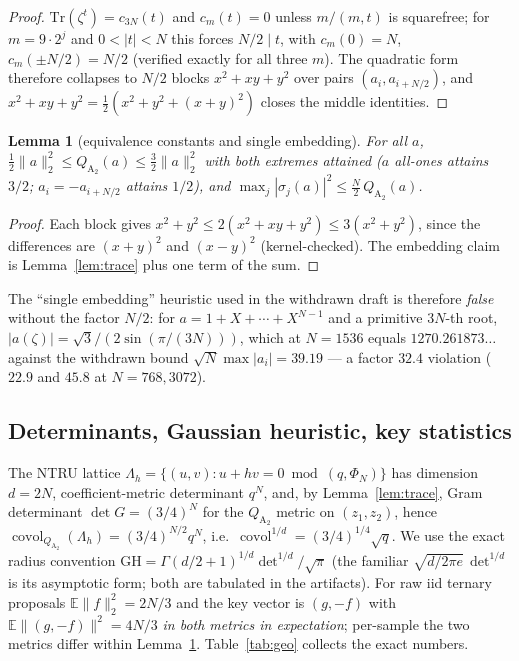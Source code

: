 \documentclass[11pt,a4paper]{article}
\newtheorem{lemma}{Lemma}
\theoremstyle{remark}
\newcommand{\Atwo}{Q_{\mathrm{A}_2}}
\begin{document}
\begin{proof}
$\mathrm{Tr}(\zeta^t)=c_{3N}(t)$ and $c_m(t)=0$ unless $m/(m,t)$ is
squarefree; for $m=9\cdot 2^{j}$ and $0<|t|<N$ this forces $N/2\mid t$, with
$c_m(0)=N$, $c_m(\pm N/2)=N/2$ (verified exactly for all three $m$). The
quadratic form therefore collapses to $N/2$ blocks
$x^2+xy+y^2$ over pairs $(a_i,a_{i+N/2})$, and
$x^2+xy+y^2=\tfrac12(x^2+y^2+(x+y)^2)$ closes the middle identities.
\end{proof}

\begin{lemma}[equivalence constants and single embedding]\label{lem:equiv}
For all $a$, $\tfrac12\|a\|_2^2\le \Atwo(a)\le \tfrac32\|a\|_2^2$ with both
extremes attained ($a$ all-ones attains $3/2$; $a_i=-a_{i+N/2}$ attains
$1/2$), and $\max_j|\sigma_j(a)|^2\le \tfrac N2\,\Atwo(a)$.
\end{lemma}

\begin{proof}
Each block gives $x^2+y^2\le 2(x^2+xy+y^2)\le 3(x^2+y^2)$, since the
differences are $(x+y)^2$ and $(x-y)^2$ (kernel-checked). The embedding claim
is Lemma~\ref{lem:trace} plus one term of the sum.
\end{proof}

The ``single embedding'' heuristic used in the withdrawn draft is therefore
\emph{false} without the factor $N/2$: for
$a=1+X+\cdots+X^{N-1}$ and a primitive $3N$-th root,
$|a(\zeta)|=\sqrt3/(2\sin(\pi/(3N)))$, which at $N=1536$ equals
$1270.261873\ldots$ against the withdrawn bound $\sqrt N\max|a_i|=39.19$ --- a
factor $32.4$ violation ($22.9$ and $45.8$ at $N=768,3072$).

\subsection{Determinants, Gaussian heuristic, key statistics}
The NTRU lattice $\Lambda_h=\{(u,v): u+hv=0 \bmod (q,\Phi_N)\}$ has
dimension $d=2N$, coefficient-metric determinant $q^N$, and, by
Lemma~\ref{lem:trace}, Gram determinant $\det G=(3/4)^N$ for the $\Atwo$
metric on $(z_1,z_2)$, hence $\operatorname{covol}_{\Atwo}(\Lambda_h)
=(3/4)^{N/2} q^N$, i.e.\ $\operatorname{covol}^{1/d}=(3/4)^{1/4}\sqrt q$.
We use the exact radius convention
$\mathrm{GH}=\Gamma(d/2+1)^{1/d}\det^{1/d}/\sqrt\pi$ (the familiar
$\sqrt{d/2\pi e}\,\det^{1/d}$ is its asymptotic form; both are tabulated in
the artifacts). For raw iid ternary proposals
$\mathbb E\|f\|_2^2=2N/3$ and the key vector is $(g,-f)$ with
$\mathbb E\|(g,-f)\|^2=4N/3$ \emph{in both metrics in expectation};
per-sample the two metrics differ within Lemma~\ref{lem:equiv}. Table~\ref{tab:geo}
collects the exact numbers.
\end{document}

